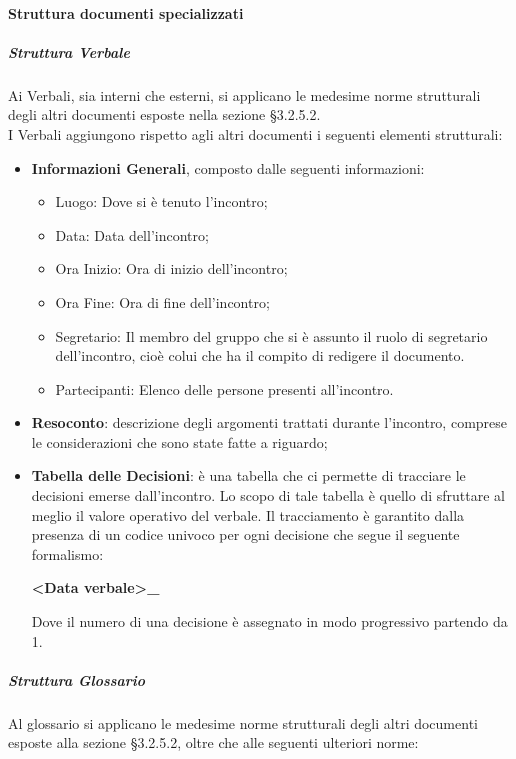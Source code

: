 			\paragraph{Struttura documenti specializzati}
				\subparagraph{Struttura Verbale}
					Ai Verbali, sia interni che esterni, si applicano le medesime norme strutturali degli altri documenti esposte nella sezione §3.2.5.2. \\
					I Verbali aggiungono rispetto agli altri documenti i seguenti elementi strutturali:
					\begin{itemize}
						\item\textbf{Informazioni Generali}, composto dalle seguenti informazioni:
							\begin{itemize}
								\item Luogo: Dove si è tenuto l’incontro;
								\item Data: Data dell’incontro;
								\item Ora Inizio: Ora di inizio dell’incontro;
								\item Ora Fine: Ora di fine dell’incontro;
								\item Segretario: Il membro del gruppo che si è assunto il ruolo di segretario dell’incontro, cioè colui che ha il compito di redigere il documento.
								\item Partecipanti: Elenco delle persone presenti all’incontro.
							\end{itemize}
						\item\textbf{Resoconto}: descrizione degli argomenti trattati durante l’incontro, comprese le considerazioni che sono state fatte a riguardo;
						\item\textbf{Tabella delle Decisioni}: è una tabella che ci permette di tracciare le decisioni emerse dall’incontro. Lo scopo di tale tabella è quello di sfruttare al meglio il valore operativo del verbale. Il tracciamento è garantito dalla presenza di un codice univoco per ogni decisione che segue il seguente formalismo: \\
							\begin{center}
								\textbf{<Data verbale>\_<Numero decisione>}
							\end{center}
							Dove il numero di una decisione è assegnato in modo progressivo partendo da 1.
					\end{itemize}
				\subparagraph{Struttura Glossario}
					Al glossario si applicano le medesime norme strutturali degli altri documenti esposte alla sezione §3.2.5.2, oltre che alle seguenti ulteriori norme:\\
